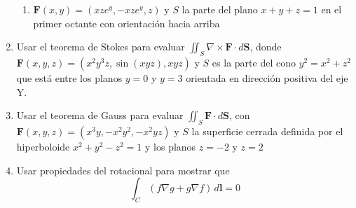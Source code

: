 \documentclass{article}
\begin{document}
\begin{enumerate}
{\begin{enumerate}
{			\color{azul}


            }

            \item{
            	$\mathbf{F} (x,y) = (xze^y,-xze^y,z)$ y $S$ la parte del plano $x + y+ z = 1$ en el primer octante con orientación hacia arriba

           \color{azul}

            }
            \end{enumerate}


        }

        \item {
            Usar el teorema de Stokes para evaluar $\iint_{S} \nabla \times \mathbf{F} \cdot d\mathbf{S}$, donde $\mathbf{F}(x,y,z) =(x^2y^3z,\sin(xyz),xyz)$ y $S$ es la parte del cono $y^2 = x^2 + z^2$ que está entre los planos $y = 0$ y $y = 3$ orientada en dirección positiva del eje Y.

            \color{azul}

        }

        \item {
            Usar el teorema de Gauss para evaluar $\iint_{S} \mathbf{F} \cdot d\mathbf{S}$, con $\mathbf{F}(x,y,z) = (x^3y,-x^2y^2,-x^2yz)$ y $S$ la superficie cerrada definida por el hiperboloide $x^2 + y^2 - z^2 = 1$ y los planos $z = -2$ y $z = 2$

            \color{azul}

        }

        \item {
            Usar propiedades del rotacional para mostrar que
            \[
                \int_C {{\left(f \nabla g + g \nabla f\right)}\,d\mathbf{l}} = 0
            \]


            \color{azul}

        }
    \end{enumerate}
\end{document}

